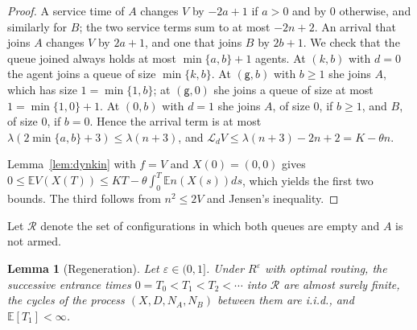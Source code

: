 \documentclass[11pt]{article}
\newtheorem{blem}[bthm]{Lemma}
\theoremstyle{definition}
\theoremstyle{remark}
\newcommand{\E}{\mathbb{E}}
\newcommand{\cL}{\mathcal{L}}
\newcommand{\Reps}{R^{\varepsilon}}
\newcommand{\gp}{\mathsf{g}}
\begin{document}
\begin{proof}
A service time of $A$ changes $V$ by $-2a+1$ if $a>0$ and by $0$ otherwise, and
similarly for $B$; the two service terms sum to at most $-2n+2$. An arrival
that joins $A$ changes $V$ by $2a+1$, and one that joins $B$ by $2b+1$. We
check that the queue joined always holds at most $\min\{a,b\}+1$ agents. At
$(k,b)$ with $d=0$ the agent joins a queue of size $\min\{k,b\}$. At $(\gp,b)$
with $b\ge1$ she joins $A$, which has size $1=\min\{1,b\}$; at $(\gp,0)$ she
joins a queue of size at most $1=\min\{1,0\}+1$. At $(0,b)$ with $d=1$ she
joins $A$, of size $0$, if $b\ge1$, and $B$, of size $0$, if $b=0$. Hence the
arrival term is at most $\lambda(2\min\{a,b\}+3)\le\lambda(n+3)$, and
$\cL_dV\le\lambda(n+3)-2n+2=K-\theta n$.

Lemma~\ref{lem:dynkin} with $f=V$ and $X(0)=(0,0)$ gives
$0\le\E V(X(T))\le KT-\theta\int_0^T\E n(X(s))ds$, which yields the first two
bounds. The third follows from $n^2\le2V$ and Jensen's inequality.
\end{proof}

Let $\mathcal{R}$ denote the set of configurations in which both queues are
empty and $A$ is not armed.

\begin{blem}[Regeneration]\label{lem:regen}
Let $\varepsilon\in(0,1]$. Under $\Reps$ with optimal routing, the successive
entrance times $0=T_0<T_1<T_2<\cdots$ into $\mathcal{R}$ are almost surely
finite, the cycles of the process $(X,D,N_A,N_B)$ between them are i.i.d., and
$\E[T_1]<\infty$.
\end{blem}
\end{document}
